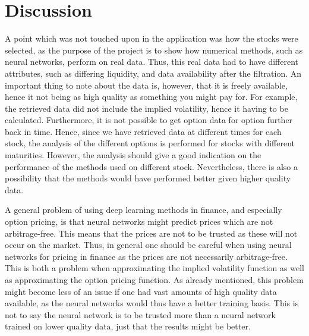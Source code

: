 \chapter{Discussion}\label{Ch.Discussion}
A point which was not touched upon in the application was how the stocks were selected, as the purpose of the project is to show how numerical methods, such as neural networks, perform on real data. Thus, this real data had to have different attributes, such as differing liquidity, and data availability after the filtration. An important thing to note about the data is, however, that it is freely available, hence it not being as high quality as something you might pay for. For example, the retrieved data did not include the implied volatility, hence it having to be calculated. Furthermore, it is not possible to get option data for option further back in time. Hence, since we have retrieved data at different times for each stock, the analysis of the different options is performed for stocks with different maturities. However, the analysis should give a good indication on the performance of the methods used on different stock. Nevertheless, there is also a possibility that the methods would have performed better given higher quality data. 

A general problem of using deep learning methods in finance, and especially option pricing, is that neural networks might predict prices which are not arbitrage-free. This means that the prices are not to be trusted as these will not occur on the market. Thus, in general one should be careful when using neural networks for pricing in finance as the prices are not necessarily arbitrage-free. This is both a problem when approximating the implied volatility function as well as approximating the option pricing function. As already mentioned, this problem might become less of an issue if one had vast amounts of high quality data available, as the neural networks would thus have a better training basis. This is not to say the neural network is to be trusted more than a neural network trained on lower quality data, just that the results might be better. 

